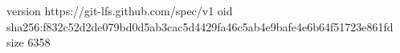 version https://git-lfs.github.com/spec/v1
oid sha256:f832c52d2de079bd0d5ab3cac5d4429fa46c5ab4e9bafe4e6b64f51723e861fd
size 6358
